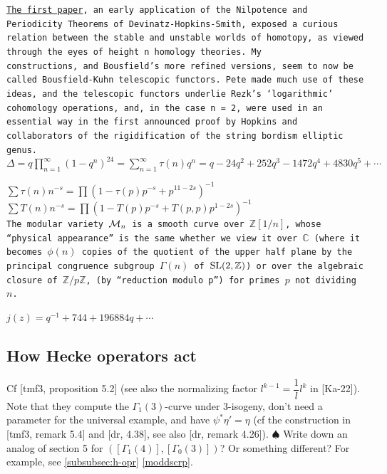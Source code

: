 \documentclass{rs}
\theoremstyle{definition}
\theoremstyle{remark}
\newcommand{\mb}[1]{\mathbb{#1}}
\newcommand{\CM}{{\cal M}}
\newcommand{\BC}{{\mb C}}
\newcommand{\BZ}{{\mb Z}}
\renewcommand{\D}{\Delta}
\newcommand{\G}{\Gamma}
\newcommand{\T}{\tau}
\newcommand{\todo}{\spadesuit}
\renewcommand{\=}{\approx}
\renewcommand{\-}{\sim}
\newcommand{\SL}{{\rm SL}}
\numberwithin{equation}{section}
\numberwithin{thm}{section}
\begin{document}
\texttt{\href{http://www.math.northwestern.edu/~zyf/at/stable homotopy theory/Morava K-theories and infinite loop spaces.pdf}{The first paper}, 
an early application of the Nilpotence and Periodicity Theorems of Devinatz-Hopkins-Smith, 
exposed a curious relation between the stable and unstable worlds of homotopy, 
as viewed through the eyes of height n homology theories. 
My \\constructions, and Bousfield's more refined versions, 
seem to now be called Bousfield-Kuhn telescopic functors. 
Pete made much use of these ideas, 
and the telescopic functors underlie Rezk's `logarithmic' cohomology operations, 
and, in the case n = 2, were used in an essential way in the first announced proof 
by Hopkins and collaborators of the rigidification of the string bordism elliptic genus. }\\

$\displaystyle \D = q \prod_{n = 1}^\infty (1 - q^n)^{24} = \sum_{n = 1}^\infty \T(n) q^n = q - 24 q^2 + 252 q^3 - 1472 q^4 + 4830 q^5 + \cdots$ 

$\displaystyle \sum \T(n) n^{-s} = \prod (1 - \T(p) p^{-s} + p^{11 - 2s})^{-1}$ \hfill 
$\displaystyle \sum T(n) n^{-s} = \prod (1 - T(p) p^{-s} + T(p,p) p^{1 - 2s})^{-1}$ \\

\texttt{The modular variety $\CM_n$ is a smooth curve over $\BZ[1/n]$, 
whose ``physical appearance'' is the same whether we view it over $\BC$ 
(where it becomes $\phi(n)$ copies of the quotient of the upper half plane 
by the principal congruence subgroup $\G(n)$ of $\SL(2,\BZ)$) 
or over the algebraic closure of $\BZ / p \BZ$, 
(by ``reduction modulo $p$'') for primes $p$ not dividing $n$.  }

$j(z) = q^{-1} + 744 + 196884 q + \cdots$ 


\subsection{How Hecke operators act}

Cf [tmf3, proposition 5.2] (see also the normalizing factor $l^{k - 1} = \dfrac{1}{l} l^k$ in [Ka-22]).  
Note that they compute the $\G_1(3)$-curve under 3-isogeny, don't need a parameter for the universal example, 
and have $\psi^* \eta' = \eta$ (cf the construction in [tmf3, remark 5.4] and [dr, 4.38], see also [dr, remark 4.26]).  
$\todo$ Write down an analog of section 5 for $([\G_1(4)],[\G_0(3)])$?  Or something different?  For example, see \ref{subsubsec:h-opr} \eqref{moddscrp}.  
\end{document}
